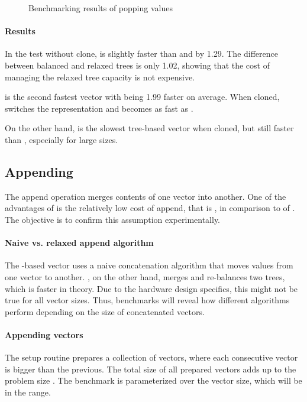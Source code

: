 \begin{figure}[!htbp]
    \caption{Benchmarking results of popping values}
    \label{fig:pop}
\end{figure}

\paragraph{Results}
In the test without clone, \imrsvec{} is slightly faster than \rbvec{} and \rrbvec{} by 1.29. The difference between balanced and relaxed trees is only 1.02, showing that the cost of managing the relaxed tree capacity is not expensive.

\pvec{} is the second fastest vector with \stdvec{} being 1.99 faster on average. When cloned, \pvec{} switches the representation and becomes as fast as \rbvec{}.

On the other hand, \imrsvec{} is the slowest tree-based vector when cloned, but still faster than \stdvec{}, especially for large sizes.

\subsection{Appending}
The append operation merges contents of one vector into another. One of the advantages of \rrbtree{} is the relatively low cost of append, that is , in comparison to  of \stdvec{}. The objective is to confirm this assumption experimentally.

\paragraph{Naive vs. relaxed append algorithm}
The \rbtree{}-based vector uses a naive concatenation algorithm that moves values from one vector to another. \rrbtree{}, on the other hand, merges and re-balances two trees, which is faster in theory. Due to the hardware design specifics, this might not be true for all vector sizes. Thus, benchmarks will reveal how different algorithms perform depending on the size of concatenated vectors.

\paragraph{Appending vectors}
The setup routine prepares a collection of vectors, where each consecutive vector is bigger than the previous. The total size of all prepared vectors adds up to the problem size \n{}. The benchmark is parameterized over the vector size, which will be in the \range{[20, \mega{1}]} range.

